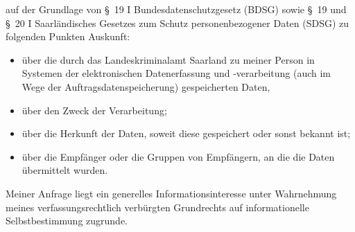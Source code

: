 auf der Grundlage von §~19 I Bundesdatenschutzgesetz (BDSG) sowie
§~19 und §~20 I Saarländisches Gesetzes zum Schutz personenbezogener Daten (SDSG)
zu folgenden Punkten Auskunft:

\begin{itemize}
  \item über die durch das Landeskriminalamt Saarland zu meiner Person in Systemen
  der elektronischen Datenerfassung und -verarbeitung (auch im Wege der
  Auftragsdatenspeicherung) gespeicherten Daten,

  \item über den Zweck der Verarbeitung;

  \item über die Herkunft der Daten, soweit diese gespeichert oder sonst bekannt ist;

  \item über die Empfänger oder die Gruppen von Empfängern, an die die Daten übermittelt wurden.
\end{itemize}

Meiner Anfrage liegt ein generelles Informationsinteresse unter Wahrnehmung
meines verfassungsrechtlich verbürgten Grundrechts auf informationelle
Selbstbestimmung zugrunde.
